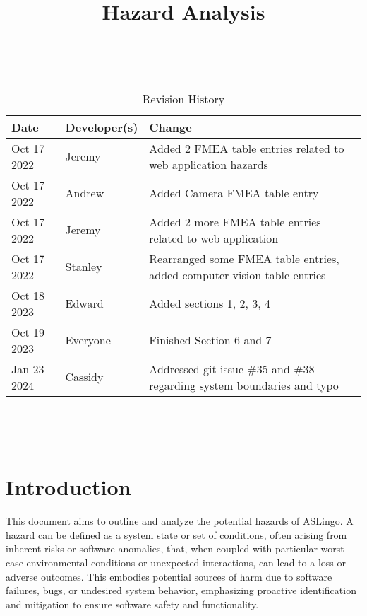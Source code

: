 \documentclass{article}
\title{Hazard Analysis\\\progname}
\author{\authname}
\date{}
\begin{document}
\maketitle
\thispagestyle{empty}

~\newpage


\begin{table}[hp]
\caption{Revision History} \label{TblRevisionHistory}
\begin{tabularx}{\textwidth}{llX}
\toprule
\textbf{Date} & \textbf{Developer(s)} & \textbf{Change}\\
\midrule
Oct 17 2022 & Jeremy & Added 2 FMEA table entries related to web application hazards\\
Oct 17 2022 & Andrew & Added Camera FMEA table entry\\
Oct 17 2022 & Jeremy & Added 2 more FMEA table entries related to web application\\
Oct 17 2022 & Stanley & Rearranged some FMEA table entries, added computer vision table entries\\
Oct 18 2023 & Edward & Added sections 1, 2, 3, 4\\
Oct 19 2023 & Everyone & Finished Section 6 and 7 \\
Jan 23 2024 & Cassidy & Addressed git issue \#35 and \#38 regarding system boundaries and typo \\
\bottomrule
\end{tabularx}
\end{table}

~\newpage

\tableofcontents

~\newpage


\section{Introduction}
This document aims to outline and analyze the potential hazards of ASLingo. A hazard can be defined as a system state or set of conditions, often arising from inherent risks or software anomalies, that, when coupled with particular worst-case environmental conditions or unexpected interactions, can lead to a loss or adverse outcomes. This embodies potential sources of harm due to software failures, bugs, or undesired system behavior, emphasizing proactive identification and mitigation to ensure software safety and functionality.
\end{document}
